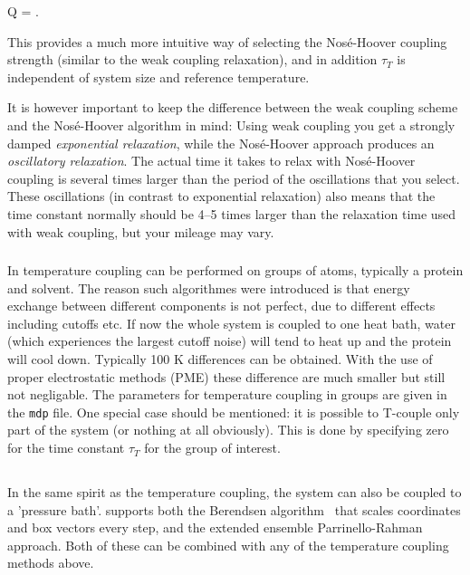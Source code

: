 {\beq
Q = .
\eeq

This provides a much more intuitive way of selecting the Nos{\'e}-Hoover
coupling strength (similar to the weak coupling relaxation), 
and in addition $\tau_T$ is independent of system size and reference
temperature. 

It is however important to keep the difference between the 
weak coupling scheme and the Nos\'e-Hoover algorithm in mind: 
Using weak coupling you get a
strongly damped {\em exponential relaxation}, 
while the Nos\'e-Hoover approach
produces an {\em oscillatory relaxation}. 
The actual time it takes to relax with Nos\'e-Hoover coupling is 
several times larger than the period of the
oscillations that you select. These oscillations (in contrast
to exponential relaxation) also means that
the time constant normally should be 4--5 times larger
than the relaxation time used with weak coupling, but your 
mileage may vary.
}  %

\subsubsection{}
In {\gromacs} temperature coupling can be performed on groups of
atoms, typically a protein and solvent. The reason such algorithmes
were introduced is that energy exchange between different components
is not perfect, due to different effects including cutoffs etc. If
now the whole system is coupled to one heat bath, water (which
experiences the largest cutoff noise) will tend to heat up and the
protein will cool down. Typically 100 K differences can be obtained.
With the use of proper electrostatic methods (PME) these difference
are much smaller but still not negligable. The parameters for
temperature coupling in groups are given in the {\tt mdp} file. One
special case should be mentioned: it is possible to T-couple only part
of the system (or nothing at all obviously). This is done by
specifying zero for the time constant $\tau_T$ for the group of interest.


\subsection{}
In the same spirit as the temperature coupling, the system can also be
coupled to a 'pressure bath'. 
{\gromacs} supports both the Berendsen algorithm~\cite{Berendsen84} 
that scales coordinates and box vectors every step, and the 
extended ensemble Parrinello-Rahman approach. Both of these can be
combined with any of the temperature coupling methods above.


